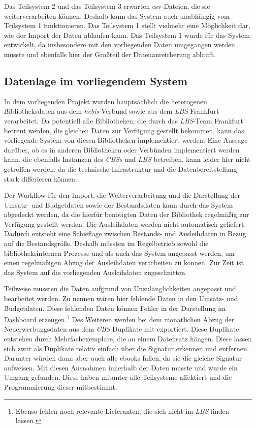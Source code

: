 Das Teilsystem 2 und das Teilsystem 3 erwarten csv-Dateien, die sie weiterverarbeiten können. 
Deshalb kann das System auch unabhängig vom Teilsystem 1 funktionieren. 
Das Teilsystem 1 stellt vielmehr eine Möglichkeit dar, wie der Import der Daten ablaufen kann. 
Das Teilsystem 1 wurde für das System entwickelt, da insbesondere mit den vorliegenden Daten umgegangen werden musste und ebenfalls hier 
der Großteil der Datenanreicherung abläuft.


\subsection{Datenlage im vorliegendem System}
In dem vorliegenden Projekt wurden hauptsächlich die heterogenen Bibliotheksdaten aus dem \textit{\acrshort{hebis}}-Verbund sowie aus dem \textit{\acrlong{LBS}} Frankfurt verarbeitet.
Da potentiell alle Bibliotheken, die durch das \textit{\acrshort{LBS}}-Team Frankfurt betreut werden, die gleichen Daten zur Verfügung gestellt bekommen,
kann das vorliegende  System von diesen Bibliotheken implementiert werden. Eine Aussage darüber, ob es in anderen Bibliotheken oder Verbünden implementiert werden kann, die ebenfalls
Instanzen des \textit{\acrlong{CBS}s} und \textit{\acrshort{LBS}} betreiben, kann leider hier nicht getroffen werden, da die technische Infrastruktur
und die Datenbereitstellung stark differieren können. 

Der Workflow für den Import, die Weiterverarbeitung und die Darstellung der Umsatz- und Budgetdaten sowie der Bestandsdaten kann durch das System
abgedeckt werden, da die hierfür benötigten Daten der Bibliothek regelmäßig zur Verfügung gestellt werden. Die Ausleihdaten werden nicht automatisch
geliefert. Dadurch entsteht eine Schieflage zwischen Bestands- und Ausleihdaten in Bezug auf die Bestandsgröße.
Deshalb müssten im Regelbetrieb sowohl die bibliotheksinternen Prozesse und als auch das System angepasst werden, um einen regelmäßigen Abzug der Ausleihdaten
verarbeiten zu können. Zur Zeit ist das System auf die vorliegenden Ausleihdaten zugeschnitten.

Teilweise mussten die Daten aufgrund von Unzulänglichkeiten angepasst und bearbeitet werden.
Zu nennen wären hier fehlende Daten in den Umsatz- und Budgetdaten. Diese fehlenden Daten können Fehler in der Darstellung im Dashboard erzeugen.\footnote{  Ebenso fehlen noch relevante Lieferanten, die sich nicht im \textit{\acrshort{LBS}} finden lassen.}
Des Weiteren werden bei dem monatlichen Abzug der Neuerwerbungsdaten aus dem \textit{\acrshort{CBS}} Duplikate mit exportiert. Diese Duplikate entstehen durch
Mehrfachexemplare, die an einem Datensatz hängen. Diese lassen sich zwar als Duplikate relativ einfach über die Signatur erkennen und entfernen.
Darunter würden dann aber auch alle ebooks fallen, da sie die gleiche Signatur aufweisen. Mit diesen Ausnahmen innerhalb der Daten musste und wurde ein Umgang gefunden. Diese haben mitunter alle Teilsysteme affektiert und
die Programmierung dieser mitbestimmt.

